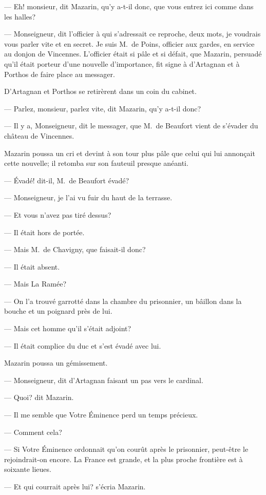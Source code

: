 — Eh! monsieur, dit Mazarin, qu'y a-t-il donc, que vous entrez ici comme dans les halles?

— Monseigneur, dit l'officier à qui s'adressait ce reproche, deux mots, je voudrais vous parler vite et en secret. Je suis
M.~de Poins, officier aux gardes, en service au donjon de Vincennes.
L'officier était si pâle et si défait, que Mazarin, persuadé qu'il était porteur d'une nouvelle d'importance, fit signe à d'Artagnan et à Porthos de faire place au messager.

D'Artagnan et Porthos se retirèrent dans un coin du cabinet.

— Parlez, monsieur, parlez vite, dit Mazarin, qu'y a-t-il donc?

— Il y a, Monseigneur, dit le messager, que M.~de Beaufort vient de s'évader du château de Vincennes.

Mazarin poussa un cri et devint à son tour plus pâle que celui qui lui annonçait cette nouvelle; il retomba sur son fauteuil presque anéanti.

— Évadé! dit-il, M.~de Beaufort évadé?

— Monseigneur, je l'ai vu fuir du haut de la terrasse.

— Et vous n'avez pas tiré dessus?

— Il était hors de portée.

— Mais M.~de Chavigny, que faisait-il donc?

— Il était absent.

— Mais La Ramée?

— On l'a trouvé garrotté dans la chambre du prisonnier, un bâillon dans la bouche et un poignard près de lui.

— Mais cet homme qu'il s'était adjoint?

— Il était complice du duc et s'est évadé avec lui.

Mazarin poussa un gémissement.

— Monseigneur, dit d'Artagnan faisant un pas vers le cardinal.

— Quoi? dit Mazarin.

— Il me semble que Votre Éminence perd un temps précieux.

— Comment cela?

— Si Votre Éminence ordonnait qu'on courût après le prisonnier, peut-être le rejoindrait-on encore. La France est grande, et la plus proche frontière est à soixante lieues.

— Et qui courrait après lui? s'écria Mazarin.

